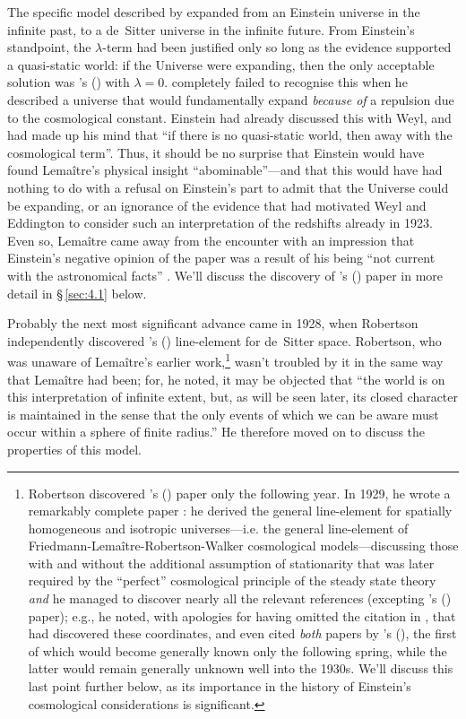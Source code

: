 \documentclass[12 pt]{article}
\def\citeapos#1{\citeauthor{#1}'s (\citeyear{#1})}
\begin{document}
{The specific model described by \citet{Lemaitre1927} expanded from an Einstein universe in the infinite past, to a de~Sitter universe in the infinite future. From Einstein's standpoint, the $\lambda$-term had been justified only so long as the evidence supported a quasi-static world: if the Universe were expanding, then the only acceptable solution was \citeapos{Friedmann1922} with $\lambda=0$. \citet{Lemaitre1927} completely failed to recognise this when he described a universe that would fundamentally expand \textit{because of} a repulsion due to the cosmological constant. Einstein had already discussed this with Weyl, and had made up his mind that ``if there is no quasi-static world, then away with the cosmological term''. Thus, it should be no surprise that Einstein would have found Lema\^{i}tre's physical insight ``abominable''---and that this would have had nothing to do with a refusal on Einstein's part to admit that the Universe could be expanding, or an ignorance of the evidence that had motivated Weyl and Eddington to consider such an interpretation of the redshifts already in 1923. Even so, Lema\^{i}tre came away from the encounter with an impression that Einstein's negative opinion of the paper was a result of his being ``not current with the astronomical facts'' \citep{Bartusiak2009}.} We'll discuss the discovery of \citeapos{Lemaitre1927} paper in more detail in \S\,\ref{sec:4.1} below.

Probably the next most significant advance came in 1928, when Robertson independently discovered \citeapos{Lemaitre1925} line-element for de~Sitter space. Robertson, who was unaware of Lema\^{i}tre's earlier work,\footnote{Robertson discovered \citeapos{Lemaitre1925} paper only the following year. In 1929, he wrote a remarkably complete paper \citep{Robertson1929}: he derived the general line-element for spatially homogeneous and isotropic universes---i.e. the general line-element of Friedmann-Lema\^{i}tre-Robertson-Walker cosmological models---discussing those with and without the additional assumption of stationarity that was later required by the ``perfect'' cosmological principle of the steady state theory \citep{Hoyle1948,Bondi1948} \textit{and} he managed to discover nearly all the relevant references (excepting \citeapos{Lemaitre1927} paper); e.g., he noted, with apologies for having omitted the citation in \citep{Robertson1928}, that \citet{Lemaitre1925} had discovered these coordinates, and even cited \textit{both} papers by \citeapos{Friedmann1922,Friedmann1924}, the first of which would become generally known only the following spring, while the latter would remain generally unknown well into the 1930s. We'll discuss this last point further below, as its importance in the history of Einstein's cosmological considerations is significant.} wasn't troubled by it in the same way that Lema\^{i}tre had been; for, he noted, it may be objected that ``the world is on this interpretation of infinite extent, but, as will be seen later, its closed character is maintained in the sense that the only events of which we can be aware must occur within a sphere of finite radius.'' He therefore moved on to discuss the properties of this model. 
\end{document}
